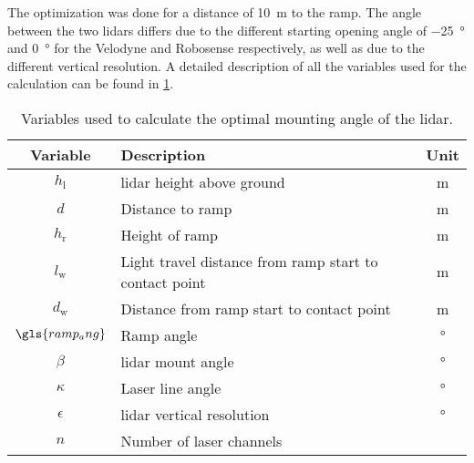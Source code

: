 The optimization was done for a distance of \SI{10}{\metre} to the ramp.
The angle between the two \glspl{lidar} differs due to the different starting opening angle of \SI{-25}{\degree} and \SI{0}{\degree} for the Velodyne and Robosense respectively, as well as due to the different vertical resolution.
A detailed description of all the variables used for the calculation can be found in \cref{tab:lidar_mount}.
\begin{table}[htbp]
	\centering
	\caption{Variables used to calculate the optimal mounting angle of the \gls{lidar}.}
	\label{tab:lidar_mount}
	\begin{tabular}[t]{clc}
		\toprule
		\textbf{Variable} & \textbf{Description}                                   & \textbf{Unit} \\
		\midrule
		$h_\mathrm{l} $   & \gls{lidar} height above ground                        & \si{\metre}   \\
		$d$               & Distance to ramp                                       & \si{\metre}   \\
		$h_\mathrm{r}$    & Height of ramp                                         & \si{\metre}   \\
		$l_\mathrm{w}$    & Light travel distance from ramp start to contact point & \si{\metre}   \\
		$d_\mathrm{w}$    & Distance from ramp start to contact point              & \si{\metre}   \\
		$\gls{ramp_ang}$  & Ramp angle                                             & \si{\degree}  \\
		$\beta$           & \gls{lidar} mount angle                                & \si{\degree}  \\
		$\kappa$          & Laser line angle                                       & \si{\degree}  \\
		$\epsilon$        & \gls{lidar} vertical resolution                        & \si{\degree}  \\
		$n$               & Number of laser channels                               &               \\
		\bottomrule
	\end{tabular}
\end{table}


